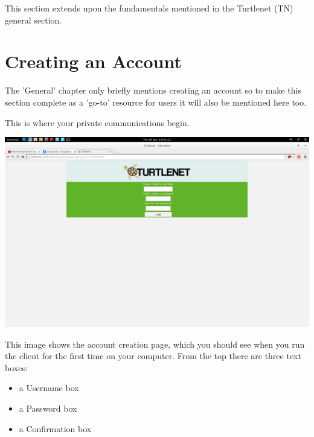 This section extends upon the fundamentals mentioned in the Turtlenet (TN)
general section.

\section{Creating an Account}
The 'General' chapter only briefly mentions creating an account so to make this
section complete as a 'go-to' resource for users it will also be mentioned here
too.

This is where your private communications begin.

\includegraphics[scale=0.2]{screenshots/Screenshot from 2014-04-29 22-41-11}

This image shows the account creation page, which you should see when you run 
the client for the first time on your computer. From the top there are three
text boxes:
\begin{itemize}
\item a Username box
\item a Password box
\item a Confirmation box
\end{itemize}

